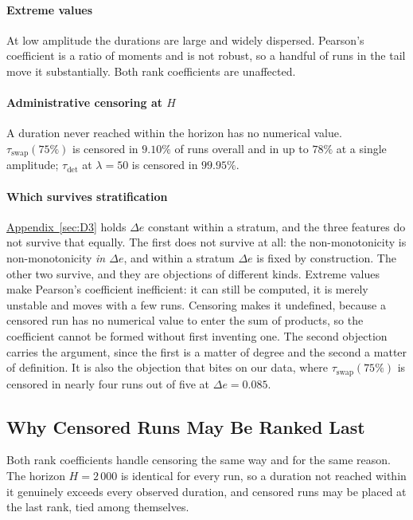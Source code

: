 \documentclass[10pt,conference]{IEEEtran}
\theoremstyle{definition}
\begin{document}
\paragraph{Extreme values} At low amplitude the durations are large and widely dispersed.
Pearson's coefficient is a ratio of moments and is not robust, so a handful of runs in the
tail move it substantially. Both rank coefficients are unaffected.

\paragraph{Administrative censoring at $H$} A duration never reached within the horizon
has no numerical value. $\tau_{\mathrm{swap}}(75\%)$ is censored in $9.10\%$ of runs
overall and in up to $78\%$ at a single amplitude; $\tau_{\mathrm{det}}$ at $\lambda = 50$
is censored in $99.95\%$.

\paragraph{Which survives stratification} \hyperref[sec:D3]{Appendix~\ref*{sec:D3}} holds $\Delta e$ constant
within a stratum, and the three features do not survive that equally. The first does not
survive at all: the non-monotonicity is non-monotonicity \emph{in $\Delta e$}, and within
a stratum $\Delta e$ is fixed by construction. The other two survive, and they are
objections of different kinds. Extreme values make Pearson's coefficient inefficient: it
can still be computed, it is merely unstable and moves with a few runs. Censoring makes it
undefined, because a censored run has no numerical value to enter the sum of products, so
the coefficient cannot be formed without first inventing one. The second objection carries
the argument, since the first is a matter of degree and the second a matter of definition.
It is also the objection that bites on our data, where $\tau_{\mathrm{swap}}(75\%)$ is
censored in nearly four runs out of five at $\Delta e = 0.085$.

\subsection{Why Censored Runs May Be Ranked Last}
\label{sec:d2:rang}

Both rank coefficients handle censoring the same way and for the same reason. The horizon
$H = 2\,000$ is identical for every run, so a duration not reached within it genuinely
exceeds every observed duration, and censored runs may be placed at the last rank, tied
among themselves.
\end{document}
